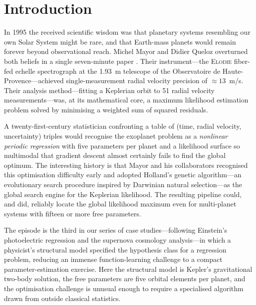 \documentclass[12pt]{article}
\begin{document}
\tableofcontents

\section{Introduction}

In 1995 the received scientific wisdom was that planetary systems
resembling our own Solar System might be rare, and that Earth-mass
planets would remain forever beyond observational reach.  Michel Mayor
and Didier Queloz overturned both beliefs in a single seven-minute paper
\citep{Mayor1995}.  Their instrument---the \textsc{Elodie} fiber-fed echelle
spectrograph \citep{Baranne1996} at the 1.93~m telescope of the
Observatoire de Haute-Provence---achieved single-measurement radial
velocity precision of $\approx 13$~m/s.  Their analysis method---fitting
a Keplerian orbit to 51 radial velocity measurements---was, at its
mathematical core, a maximum likelihood estimation problem solved by
minimising a weighted sum of squared residuals.

A twenty-first-century statistician confronting a table of
(time, radial velocity, uncertainty) triples would recognise the
exoplanet problem as a \emph{nonlinear periodic regression} with five
parameters per planet and a likelihood surface so multimodal that
gradient descent almost certainly fails to find the global optimum.
The interesting history is that Mayor and his collaborators recognised
this optimisation difficulty early and adopted Holland's genetic
algorithm---an evolutionary search procedure inspired by Darwinian
natural selection---as the global search engine for the Keplerian
likelihood.  The resulting pipeline could, and did, reliably locate
the global likelihood maximum even for multi-planet systems with
fifteen or more free parameters.

The episode is the third in our series of case studies---following
Einstein's photoelectric regression and the supernova cosmology
analysis---in which a physicist's structural model specified the
hypothesis class for a regression problem, reducing an immense
function-learning challenge to a compact parameter-estimation exercise.
Here the structural model is Kepler's gravitational two-body solution,
the free parameters are five orbital elements per planet, and the
optimisation challenge is unusual enough to require a specialised
algorithm drawn from outside classical statistics.
\end{document}
